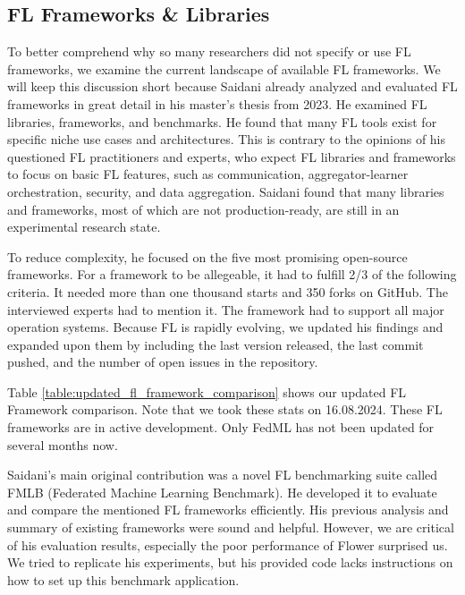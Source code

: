 \subsection{FL Frameworks \& Libraries}\label{subsection:fl_frameworks_and_libraries}

To better comprehend why so many researchers did not specify or use FL frameworks, we examine
the current landscape of available FL frameworks.
We will keep this discussion short because
Saidani already analyzed and evaluated FL frameworks in great detail
in his master's thesis \cite{thesis:tum_fl_framework_comparison} from 2023.
He examined FL libraries, frameworks, and benchmarks.
He found that many FL tools exist for specific niche use cases and architectures.
This is contrary to the opinions of his questioned FL practitioners and experts, who
expect FL libraries and frameworks to focus on basic FL features,
such as communication, aggregator-learner orchestration, security, and data aggregation.
Saidani found that many libraries and frameworks, most of which are not production-ready,
are still in an experimental research state.

To reduce complexity, he focused on the five most promising open-source frameworks.
For a framework to be allegeable, it had to fulfill 2/3 of the following criteria.
It needed more than one thousand starts and 350 forks on GitHub.
The interviewed experts had to mention it.
The framework had to support all major operation systems.
Because FL is rapidly evolving, we updated his findings and expanded upon them by including
the last version released, the last commit pushed, and the number of open issues in the repository.



Table \ref{table:updated_fl_framework_comparison} shows our updated FL Framework comparison.
Note that we took these stats on 16.08.2024.
These FL frameworks are in active development. 
Only FedML has not been updated for several months now.

Saidani's main original contribution was a novel FL benchmarking suite called FMLB (Federated Machine Learning Benchmark).
He developed it to evaluate and compare the mentioned FL frameworks efficiently.
His previous analysis and summary of existing frameworks were sound and helpful.
However, we are critical of his evaluation results, especially the poor performance of Flower surprised us.
We tried to replicate his experiments, but his provided code \cite{tum_fl_framework_thesis_github}
lacks instructions on how to set up this benchmark application.


